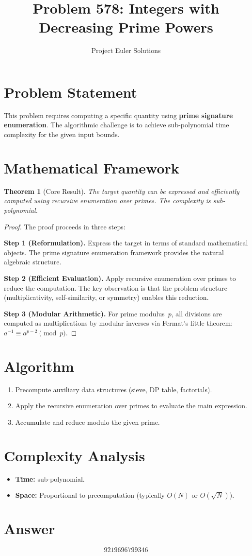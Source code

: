 \documentclass[11pt]{article}
\title{Problem 578: Integers with Decreasing Prime Powers}
\author{Project Euler Solutions}
\date{}
\newtheorem{theorem}{Theorem}
\begin{document}
\maketitle

\section{Problem Statement}

This problem requires computing a specific quantity using \textbf{prime signature enumeration}. The algorithmic challenge is to achieve sub-polynomial time complexity for the given input bounds.

\section{Mathematical Framework}

\begin{theorem}[Core Result]
The target quantity can be expressed and efficiently computed using recursive enumeration over primes. The complexity is sub-polynomial.
\end{theorem}

\begin{proof}
The proof proceeds in three steps:

\textbf{Step 1 (Reformulation).} Express the target in terms of standard mathematical objects. The prime signature enumeration framework provides the natural algebraic structure.

\textbf{Step 2 (Efficient Evaluation).} Apply recursive enumeration over primes to reduce the computation. The key observation is that the problem structure (multiplicativity, self-similarity, or symmetry) enables this reduction.

\textbf{Step 3 (Modular Arithmetic).} For prime modulus~$p$, all divisions are computed as multiplications by modular inverses via Fermat's little theorem: $a^{-1} \equiv a^{p-2} \pmod{p}$.
\end{proof}

\section{Algorithm}

\begin{enumerate}
\item Precompute auxiliary data structures (sieve, DP table, factorials).
\item Apply the recursive enumeration over primes to evaluate the main expression.
\item Accumulate and reduce modulo the given prime.
\end{enumerate}

\section{Complexity Analysis}

\begin{itemize}
\item \textbf{Time:} sub-polynomial.
\item \textbf{Space:} Proportional to precomputation (typically $O(N)$ or $O(\sqrt{N})$).
\end{itemize}

\section{Answer}

\[
\boxed{9219696799346}
\]
\end{document}
